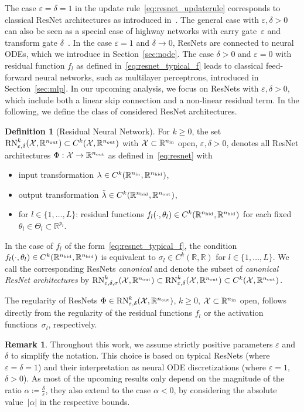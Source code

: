 \documentclass[10pt]{article}
\theoremstyle{definition}
\newtheorem{definition}[theorem]{Definition}
\newtheorem{remark}[theorem]{Remark}
\numberwithin{equation}{section}
\newcommand{\eps}{\varepsilon}
\newcommand\abs[1]{\left\lvert#1\right\rvert}
\newcommand{\R}{\mathbb{R}}
\newcommand*{\nout}{n_\textup{out}}
\newcommand*{\nhid}{n_\textup{hid}}
\newcommand*{\nin}{n_\textup{in}}
\newcommand*{\RN}{\textup{RN}_{\eps,\delta}^k(\mathcal{X},\R^{\nout})}
\newcommand*{\RNs}{\textup{RN}_{\eps,\delta,\sigma}^k(\mathcal{X},\R^{\nout})}
\begin{document}
The case $\eps = \delta = 1$ in the update rule~\eqref{eq:resnet_updaterule} corresponds to classical ResNet architectures as introduced in~\cite{he16}. The general case with $\eps, \delta > 0$ can also be seen as a special case of highway networks with carry gate~$\eps$ and transform gate $\delta$~\cite{Srivastava2015}. In the case $\eps = 1$ and $\delta \rightarrow 0$, ResNets are connected to neural ODEs, which we introduce in Section~\ref{sec:node}. The case $\delta>0$ and $\eps  = 0$ with residual function $f_l$ as defined in~\eqref{eq:resnet_typical_f} leads to classical feed-forward neural networks, such as multilayer perceptrons, introduced in Section~\ref{sec:mlp}. In our upcoming analysis, we focus on ResNets with $\eps,\delta>0$, which include both a linear skip connection and a non-linear residual term. In the following, we define the class of considered ResNet architectures.

\begin{definition}[Residual Neural Network] \label{def:resnet}
	For $k \geq 0$, the set $\RN\subset C^k(\mathcal{X},\R^{\nout})$ with $\mathcal{X}\subset \R^{\nin}$ open, $\eps,\delta>0$, denotes all ResNet architectures $\Phi: \mathcal{X} \rightarrow \R^{\nout}$ as defined in~\eqref{eq:resnet} with 
	\begin{itemize}
		\item input transformation $\lambda \in C^k(\R^{\nin},\R^{\nhid})$,
		\item output transformation $\tilde\lambda \in C^k(\R^{\nhid},\R^{\nout})$,
		\item for $l \in \{1,\ldots,L\}$: residual functions $f_l(\cdot, \theta_l)\in C^{k}(\R^{\nhid}, \R^{\nhid})$ for each fixed $\theta_l \in \Theta_l \subset \R^{p_l}$.
	\end{itemize}
	In the case of $f_l$ of the form~\eqref{eq:resnet_typical_f}, the condition $f_l(\cdot, \theta_l)\in C^{k}(\R^{\nhid}, \R^{\nhid})$ is equivalent to $\sigma_l\in C^{k}(\R,\R)$ for $l \in \{1,\ldots,L\}$. We call the corresponding ResNets \emph{canonical} and denote the subset of \emph{canonical ResNet architectures} by $\RNs \subset \RN \subset C^k(\mathcal{X},\R^{\nout})$.
\end{definition}

The regularity of ResNets $\Phi\in \RN$, $k\geq 0$, $\mathcal{X}\subset \R^{\nin}$ open, follows directly from the regularity of the residual functions $f_l$ or the activation functions~$\sigma_l$, respectively.

\begin{remark}
    Throughout this work, we assume strictly positive parameters $\eps$ and $\delta$ to simplify the notation. This choice is based on typical ResNets (where $\eps = \delta = 1$) and their interpretation as neural ODE discretizations (where $\eps = 1$, $\delta>0$). As most of the upcoming results only depend on the magnitude of the ratio $\alpha \coloneqq \frac{\delta}{\eps}$, they also extend to the case $\alpha <0$, by considering the absolute value~$\abs{\alpha}$ in the respective bounds.
\end{remark}
\end{document}
